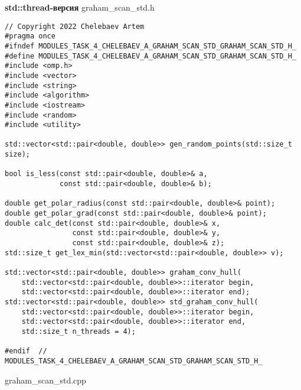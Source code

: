 \documentclass{report}
\begin{document}
\textbf{std::thread-версия}
\newline
\newline graham\_scan\_std.h
\begin{lstlisting}
// Copyright 2022 Chelebaev Artem
#pragma once
#ifndef MODULES_TASK_4_CHELEBAEV_A_GRAHAM_SCAN_STD_GRAHAM_SCAN_STD_H_
#define MODULES_TASK_4_CHELEBAEV_A_GRAHAM_SCAN_STD_GRAHAM_SCAN_STD_H_
#include <omp.h>
#include <vector>
#include <string>
#include <algorithm>
#include <iostream>
#include <random>
#include <utility>

std::vector<std::pair<double, double>> gen_random_points(std::size_t size);

bool is_less(const std::pair<double, double>& a,
             const std::pair<double, double>& b);

double get_polar_radius(const std::pair<double, double>& point);
double get_polar_grad(const std::pair<double, double>& point);
double calc_det(const std::pair<double, double>& x,
                const std::pair<double, double>& y,
                const std::pair<double, double>& z);
std::size_t get_lex_min(std::vector<std::pair<double, double>> v);

std::vector<std::pair<double, double>> graham_conv_hull(
    std::vector<std::pair<double, double>>::iterator begin,
    std::vector<std::pair<double, double>>::iterator end);
std::vector<std::pair<double, double>> std_graham_conv_hull(
    std::vector<std::pair<double, double>>::iterator begin,
    std::vector<std::pair<double, double>>::iterator end,
    std::size_t n_threads = 4);

#endif  // MODULES_TASK_4_CHELEBAEV_A_GRAHAM_SCAN_STD_GRAHAM_SCAN_STD_H_

\end{lstlisting}
graham\_scan\_std.cpp
\end{document}
